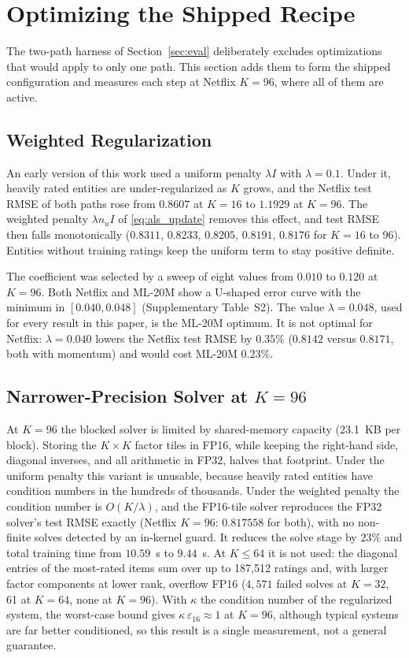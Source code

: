 \section{Optimizing the Shipped Recipe}
\label{sec:extended}

The two-path harness of Section~\ref{sec:eval} deliberately excludes optimizations that would apply to only one path. This section adds them to form the shipped configuration and measures each step at Netflix $K=96$, where all of them are active.
\subsection{Weighted Regularization}
\label{ssec:weightedlambda}

An early version of this work used a uniform penalty $\lambda I$ with $\lambda = 0.1$. Under it, heavily rated entities are under-regularized as $K$ grows, and the Netflix test RMSE of both paths rose from $0.8607$ at $K=16$ to $1.1929$ at $K=96$. The weighted penalty $\lambda n_u I$ of \eqref{eq:als_update} removes this effect, and test RMSE then falls monotonically ($0.8311$, $0.8233$, $0.8205$, $0.8191$, $0.8176$ for $K = 16$ to 96). Entities without training ratings keep the uniform term to stay positive definite.

The coefficient was selected by a sweep of eight values from $0.010$ to $0.120$ at $K=96$. Both Netflix and ML-20M show a U-shaped error curve with the minimum in $[0.040, 0.048]$ (Supplementary Table~S2). The value $\lambda = 0.048$, used for every result in this paper, is the ML-20M optimum. It is not optimal for Netflix: $\lambda = 0.040$ lowers the Netflix test RMSE by $0.35\%$ ($0.8142$ versus $0.8171$, both with momentum) and would cost ML-20M $0.23\%$.
\subsection{Narrower-Precision Solver at $K=96$}
\label{ssec:fp16solver}

At $K=96$ the blocked solver is limited by shared-memory capacity (23.1~KB per block). Storing the $K \times K$ factor tiles in FP16, while keeping the right-hand side, diagonal inverses, and all arithmetic in FP32, halves that footprint. Under the uniform penalty this variant is unusable, because heavily rated entities have condition numbers in the hundreds of thousands. Under the weighted penalty the condition number is $O(K/\lambda)$, and the FP16-tile solver reproduces the FP32 solver's test RMSE exactly (Netflix $K=96$: $0.817558$ for both), with no non-finite solves detected by an in-kernel guard. It reduces the solve stage by $23\%$ and total training time from $10.59$~s to $9.44$~s. At $K \le 64$ it is not used: the diagonal entries of the most-rated items sum over up to 187{,}512 ratings and, with larger factor components at lower rank, overflow FP16 ($4{,}571$ failed solves at $K=32$, 61 at $K=64$, none at $K=96$). With $\kappa$ the condition number of the regularized system, the worst-case bound gives $\kappa\,\varepsilon_{16} \approx 1$ at $K=96$, although typical systems are far better conditioned, so this result is a single measurement, not a general guarantee.

